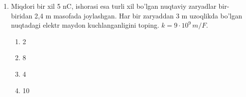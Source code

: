 \begin{enumerate}
    \item Miqdori bir xil 5 nC, ishorasi esa turli xil bo’lgan nuqtaviy zaryadlar bir-biridan 2,4 m masofada joylashgan. Har bir zaryaddan 3 m uzoqlikda bo’lgan nuqtadagi elektr maydon kuchlanganligini toping. $k=9 \cdot 10^9 \, m/F$. 
    \begin{enumerate}[label=\Alph*)]
        \item 2
        \item 8
        \item 4 %
        \item 10
    \end{enumerate}

\end{enumerate}